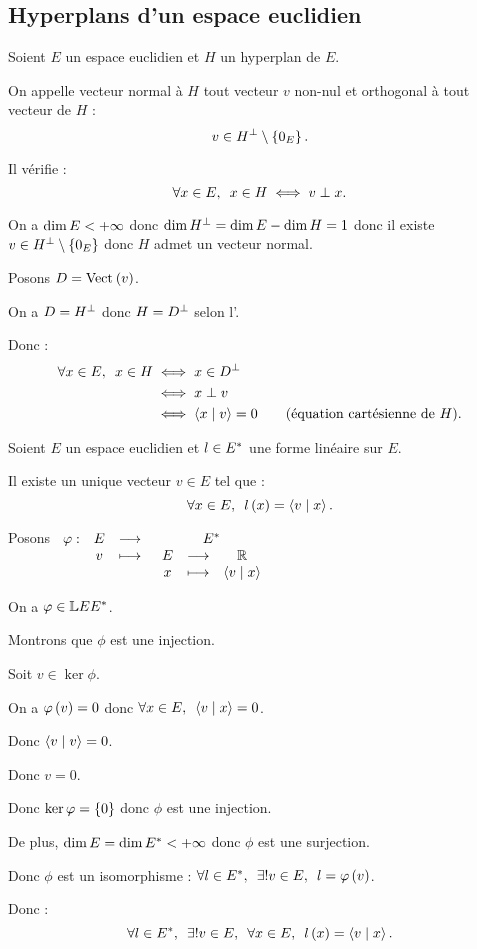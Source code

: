 \subsection{Hyperplans d'un espace euclidien}

\begin{defprop}
Soient \(E\) un espace euclidien et \(H\) un hyperplan de \(E\).

On appelle vecteur normal à \(H\) tout vecteur \(v\) non-nul et orthogonal à tout vecteur de \(H\) : \[v\in H^{\perp}\setminus\left\lbrace0_E\right\rbrace.\]

Il vérifie : \[\quantifs{\forall x\in E}x\in H\ssi v\perp x.\]
\end{defprop}

\begin{dem}
On a \(\dim E<+\infty\) donc \(\dim H^{\perp}=\dim E-\dim H=1\) donc il existe \(v\in H^{\perp}\setminus\left\lbrace0_E\right\rbrace\) donc \(H\) admet un vecteur normal.

Posons \(D=\Vect{v}\).

On a \(D=H^{\perp}\) donc \(H=D^{\perp}\) selon l'.

Donc : \[\begin{aligned}
\quantifs{\forall x\in E}x\in H&\ssi x\in D\ortho \\
&\ssi x\perp v \\
&\ssi\ps{x}{v}=0\qquad\text{(équation cartésienne de \(H\)).}
\end{aligned}\]
\end{dem}

\begin{prop}
Soient \(E\) un espace euclidien et \(l\in E^{*}\) une forme linéaire sur \(E\).

Il existe un unique vecteur \(v\in E\) tel que : \[\quantifs{\forall x\in E}l\paren{x}=\ps{v}{x}.\]
\end{prop}

\begin{dem}
Posons \(\begin{array}[t]{cccc}\varphi : & E & \longrightarrow & E^{*} \\ & v & \longmapsto & \begin{array}[t]{ccc}E & \longrightarrow & \mathbb{R} \\ x & \longmapsto & \left\langle v\;\middle|\; x\right\rangle\end{array}\end{array}\)

On a \(\varphi\in\mathbb{L}{E}{E^{*}}\).

Montrons que \(\phi\) est une injection.

Soit \(v\in\ker\phi\).

On a \(\varphi\left(v\right)=0\) donc \(\quantifs{\forall x\in E}\ps{v}{x}=0\).

Donc \(\left\langle v\;\middle|\; v\right\rangle=0\).

Donc \(v=0\).

Donc \(\ker\varphi=\left\lbrace0\right\rbrace\) donc \(\phi\) est une injection.

De plus, \(\dim E=\dim E^{*}<+\infty\) donc \(\phi\) est une surjection.

Donc \(\phi\) est un isomorphisme : \(\quantifs{\forall l\in E\etoile;\exists!v\in E}l=\phi\paren{v}\).

Donc : \[\quantifs{\forall l\in E\etoile;\exists!v\in E;\forall x\in E}l\paren{x}=\ps{v}{x}.\]
\end{dem}

